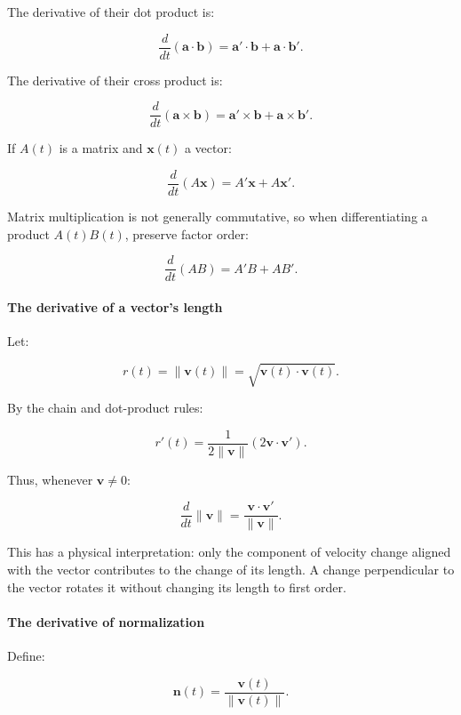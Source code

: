 The derivative of their dot product is:

\[
\frac d{dt}(\mathbf a\cdot\mathbf b) =\mathbf a'\cdot\mathbf b+\mathbf a\cdot\mathbf b'.
\]

The derivative of their cross product is:

\[
\frac d{dt}(\mathbf a\times\mathbf b) =\mathbf a'\times\mathbf b+\mathbf a\times\mathbf b'.
\]

If \(A(t)\) is a matrix and \(\mathbf x(t)\) a vector:

\[
\frac d{dt}(A\mathbf x) =A'\mathbf x+A\mathbf x'.
\]

Matrix multiplication is not generally commutative, so when differentiating a product \(A(t)B(t)\), preserve factor order:

\[
\frac d{dt}(AB)=A'B+AB'.
\]

\paragraph{The derivative of a vector's length}\label{02-foundations-ii-ch021-the-derivative-of-a-vectors-length}

\hypertarget{02-foundations-ii-ch021-the-derivative-of-a-vectors-length}{}

Let:

\[
r(t)=\|\mathbf v(t)\| =\sqrt{\mathbf v(t)\cdot\mathbf v(t)}.
\]

By the chain and dot-product rules:

\[
r'(t)=\frac1{2\|\mathbf v\|} \left(2\mathbf v\cdot\mathbf v'\right).
\]

Thus, whenever \(\mathbf v\ne0\):

\[
\boxed{\frac d{dt}\|\mathbf v\| =\frac{\mathbf v\cdot\mathbf v'}{\|\mathbf v\|}}.
\]

This has a physical interpretation: only the component of velocity change aligned with the vector contributes to the change of its length. A change perpendicular to the vector rotates it without changing its length to first order.

\paragraph{The derivative of normalization}\label{02-foundations-ii-ch021-the-derivative-of-normalization}

\hypertarget{02-foundations-ii-ch021-the-derivative-of-normalization}{}

Define:

\[
\mathbf n(t)=\frac{\mathbf v(t)}{\|\mathbf v(t)\|}.
\]

